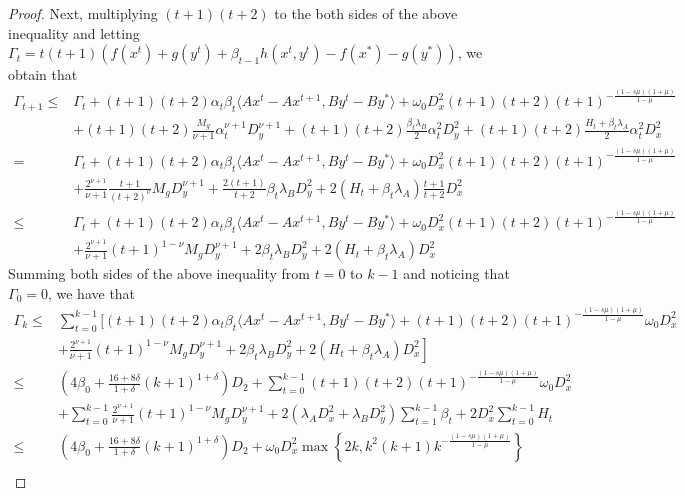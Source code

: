 \documentclass{article}
\numberwithin{equation}{section}
\begin{document}
\begin{proof}
    Next, multiplying $(t+1)(t+2)$ to the both sides of the above inequality and letting 
    $\Gamma_t = t(t+1)(f(x^t)+g(y^t)+\beta_{t-1}h(x^t,y^t)-f(x^*)-g(y^*))$, we obtain that  
    \begin{align}
        \Gamma_{t+1} \leq& \Gamma_t+(t+1)(t+2)\alpha_t\beta_t\langle Ax^t-Ax^{t+1}, By^t-By^*\rangle +\omega_0D_x^2(t+1)(t+2) (t+1)^{-\frac{(1-s\mu)(1+\mu)}{1-\mu}} \nonumber \\
        &+ (t+1)(t+2)\frac{M_g}{\nu+1}\alpha_t^{\nu+1}D_y^{\nu+1}+(t+1)(t+2)\frac{\beta_t\lambda_B}{2}\alpha_t^2D_y^2 + (t+1)(t+2)\frac{H_t+\beta_t\lambda_A}{2}\alpha_t^2D_x^2\nonumber \\
        =&\Gamma_t+(t+1)(t+2)\alpha_t\beta_t\langle Ax^t-Ax^{t+1}, By^t-By^*\rangle +\omega_0D_x^2(t+1)(t+2) (t+1)^{-\frac{(1-s\mu)(1+\mu)}{1-\mu}} \nonumber \\
        &+\frac{2^{\nu+1}}{\nu+1}\frac{t+1}{(t+2)^{\nu}}M_gD_y^{\nu+1} +\frac{2(t+1)}{t+2}\beta_t\lambda_BD_y^2 +2(H_t+\beta_t\lambda_A)\frac{t+1}{t+2}D_x^2 \nonumber \\
        \leq &\Gamma_t+(t+1)(t+2)\alpha_t\beta_t\langle Ax^t-Ax^{t+1}, By^t-By^*\rangle +\omega_0D_x^2(t+1)(t+2) (t+1)^{-\frac{(1-s\mu)(1+\mu)}{1-\mu}} \nonumber \\
        &+\frac{2^{\nu+1}}{\nu+1}(t+1)^{1-\nu}M_gD_y^{\nu+1} +2\beta_t\lambda_BD_y^2 +2(H_t+\beta_t\lambda_A)D_x^2 \nonumber
    \end{align}
    Summing both sides of the above inequality from $t=0$ to $k-1$ and noticing that $\Gamma_0 =0$, we have that
    \begin{align}
        \Gamma_k \leq& \sum\limits_{t=0}^{k-1} \Big[(t+1)(t+2)\alpha_t\beta_t\langle Ax^t-Ax^{t+1}, By^t-By^*\rangle +(t+1)(t+2) (t+1)^{-\frac{(1-s\mu)(1+\mu)}{1-\mu}}\omega_0D_x^2  \nonumber \\
        &\left.+\frac{2^{\nu+1}}{\nu+1}(t+1)^{1-\nu}M_gD_y^{\nu+1} +2\beta_t\lambda_BD_y^2 +2(H_t+\beta_t\lambda_A)D_x^2  \right] \nonumber  \\
        \overset{\mathop{(a)}}{\leq} & \left(4\beta_0+\frac{16+8\delta}{1+\delta}(k+1)^{1+\delta}\right)D_2 +\sum\limits_{t=0}^{k-1}(t+1)(t+2)(t+1)^{-\frac{(1-s\mu)(1+\mu)}{1-\mu}}\omega_0D_x^2 \nonumber \\
        &+\sum\limits_{t=0}^{k-1}\frac{2^{\nu+1}}{\nu+1}(t+1)^{1-\nu}M_gD_y^{\nu+1} +2(\lambda_AD_x^2+ \lambda_BD_y^2)\sum\limits_{t=1}^{k-1} \beta_t
        +2D_x^2\sum\limits_{t=0}^{k-1}H_t              \nonumber \\
        \overset{\mathop{(b)}}{\leq} & \left(4\beta_0+\frac{16+8\delta}{1+\delta}(k+1)^{1+\delta}\right)D_2+\omega_0D_x^2 \max\left\{ 2k, k^2(k+1)k^{-\frac{(1-s\mu)(1+\mu)}{1-\mu}} \right\} \nonumber \\

\end{align}
\end{proof}
\end{document}
